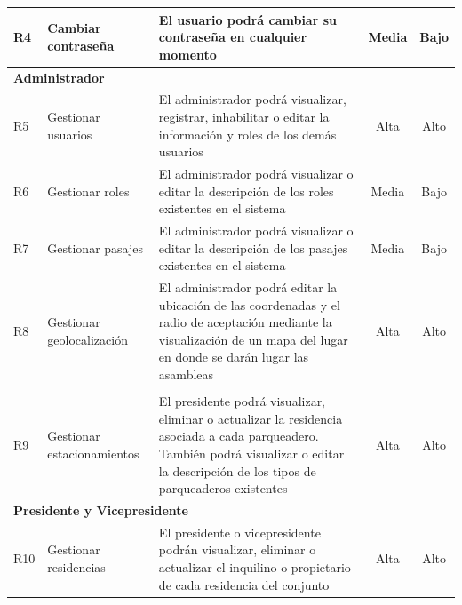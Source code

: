 \begin{footnotesize}
\begin{spacing}{1}
\begin{center}
\begin{longtable}[l]{|p{}|p{}|p{}|p{}| p{}|}
            \hline
            R4          & Cambiar contraseña                                & El usuario podrá cambiar su contraseña en cualquier momento & \multicolumn{1}{c|}{Media} & \multicolumn{1}{c|}{Bajo}\\
            \hline
            \multicolumn{5}{|l|}{ \textbf{Administrador} } \\
            \hline
            R5          & Gestionar usuarios                                & El administrador podrá visualizar, registrar, inhabilitar o editar la información y roles de los demás usuarios  & \multicolumn{1}{c|}{Alta} & \multicolumn{1}{c|}{Alto}\\
            \hline
            R6          & Gestionar roles                                   & El administrador podrá visualizar o editar la descripción de los roles existentes en el sistema  & \multicolumn{1}{c|}{Media} & \multicolumn{1}{c|}{Bajo}\\
            \hline
            R7          & Gestionar pasajes                                 & El administrador podrá visualizar o editar la descripción de los pasajes existentes en el sistema  & \multicolumn{1}{c|}{Media} & \multicolumn{1}{c|}{Bajo}\\
            \hline
            R8          & Gestionar geolocalización                         & El administrador podrá editar la ubicación de las coordenadas y el radio de aceptación mediante la visualización de un mapa del lugar en donde se darán lugar las asambleas  & \multicolumn{1}{c|}{Alta} & \multicolumn{1}{c|}{Alto}\\
            \hline
            \newpage
            \hline
            \multicolumn{5}{|l|}{ \textbf{Presidente} } \\
            \hline
            R9 & Gestionar estacionamientos & El presidente podrá visualizar, eliminar o actualizar la residencia asociada a cada parqueadero.
            También podrá visualizar o editar la descripción de los tipos de parqueaderos existentes & \multicolumn{1}{c|}{Alta} & \multicolumn{1}{c|}{Alto}\\
            \hline
            \multicolumn{5}{|l|}{ \textbf{Presidente y Vicepresidente} } \\
            \hline
            R10         & Gestionar residencias                             & El presidente o vicepresidente podrán visualizar, eliminar o actualizar el inquilino o propietario de cada residencia del conjunto & \multicolumn{1}{c|}{Alta} & \multicolumn{1}{c|}{Alto}\\

\end{longtable}
\end{center}
\end{spacing}
\end{footnotesize}
